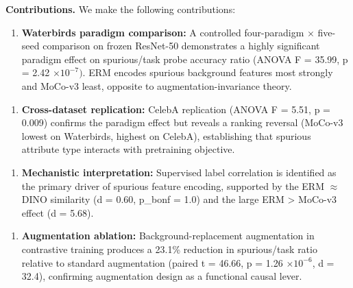 \textbf{Contributions.} We make the following contributions:

\begin{enumerate}
\item \textbf{Waterbirds paradigm comparison:} A controlled four-paradigm $\times$ five-seed comparison on frozen ResNet-50 demonstrates a highly significant paradigm effect on spurious/task probe accuracy ratio (ANOVA F = 35.99, p = 2.42 $\times 10^{-7})$. ERM encodes spurious background features most strongly and MoCo-v3 least, opposite to augmentation-invariance theory.
\end{enumerate}

\begin{enumerate}
\item \textbf{Cross-dataset replication:} CelebA replication (ANOVA F = 5.51, p = 0.009) confirms the paradigm effect but reveals a ranking reversal (MoCo-v3 lowest on Waterbirds, highest on CelebA), establishing that spurious attribute type interacts with pretraining objective.
\end{enumerate}

\begin{enumerate}
\item \textbf{Mechanistic interpretation:} Supervised label correlation is identified as the primary driver of spurious feature encoding, supported by the ERM $\approx$ DINO similarity (d = 0.60, p\_bonf = 1.0) and the large ERM > MoCo-v3 effect (d = 5.68).
\end{enumerate}

\begin{enumerate}
\item \textbf{Augmentation ablation:} Background-replacement augmentation in contrastive training produces a 23.1\% reduction in spurious/task ratio relative to standard augmentation (paired t = 46.66, p = 1.26 $\times 10^{-6}$, d = 32.4), confirming augmentation design as a functional causal lever.
\end{enumerate}

